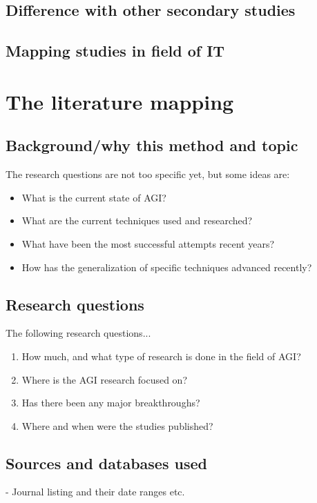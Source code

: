 \documentclass[utf8,english]{gradu3}
\begin{document}
\section{Difference with other secondary studies}

\section{Mapping studies in field of IT}

\chapter{The literature mapping}

\section{Background/why this method and topic}
The research questions are not too specific yet, but some ideas are:
\begin{itemize}
    \item What is the current state of AGI?
    \item What are the current techniques used and researched?
    \item What have been the most successful attempts recent years?
    \item How has the generalization of specific techniques advanced recently?
\end{itemize}

\section{Research questions}

The following research questions...


\begin{enumerate}
  \item How much, and what type of research is done in the field of AGI?
  \item Where is the AGI research focused on?
  \item Has there been any major breakthroughs?
  \item Where and when were the studies published?
\end{enumerate}

\section{Sources and databases used}
- Journal listing and their date ranges etc.
\end{document}
